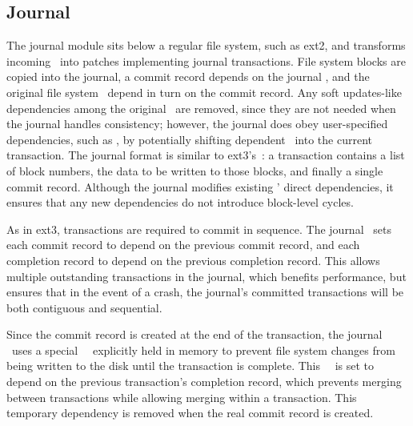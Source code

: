 
\subsection{Journal}
\label{sec:modules:journal}

The journal module sits below a regular file system, such as ext2, and transforms
incoming \patches\ into patches implementing journal transactions.
%
File system blocks are copied into the journal, a commit record depends on the
journal \patches, and the original file system \patches\ depend in turn on the
commit record.
%
Any soft updates-like dependencies among the original \patches\ are removed,
since they are not needed when the journal handles consistency; however, the
journal does obey user-specified dependencies, such as
\patchgroups, by potentially shifting dependent \patches\ into the current
transaction.
%
%
The journal format is similar to ext3's~\cite{tweedie98journaling}: a
transaction contains a list of block numbers, the data to be written to
those blocks, and finally a single commit record.
%
Although the journal modifies existing \patches' direct dependencies, it
ensures that any new dependencies do not introduce block-level
cycles.

As in ext3, transactions are required to commit in sequence. The
journal \module\ sets each commit record to depend on the previous commit record, and each
completion record to depend on the previous completion record. This allows
multiple outstanding transactions in the journal, which benefits performance,
but ensures that in the event of a crash, the journal's committed
transactions will be both contiguous and sequential.

Since the commit record is created at the end of the transaction, the journal
\module\ uses a special \noop\ \patch\ explicitly held in memory to prevent
file system changes from being written to the disk until the transaction is
complete. This \noop\ \patch\ is set to depend on the previous transaction's
completion record, which prevents merging between transactions while allowing
merging within a transaction. This temporary dependency is removed when the
real commit record is created.

